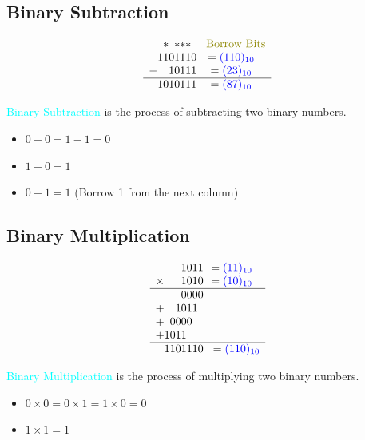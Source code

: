 \documentclass{book}
\begin{document}
\subsection{Binary Subtraction}
\raggedright
\begin{figure}
    \[
    \begin{array}{c@{}c@{}c@{}c@{}c@{}c@{}c@{}c@{}c}
        & & * & & * & * & * & & \hspace{3mm} \textcolor{olive}{\text{Borrow Bits}}\\
        & 1 & 1 & 0 & 1 & 1 & 1 & 0 & = \textcolor{blue}{(110)_{10}}\\
        - & & & 1 & 0 & 1 & 1 & 1 & = \textcolor{blue}{(23)_{10}}\\
        \hline
        & 1 & 0 & 1 & 0 & 1 & 1 & 1 & = \textcolor{blue}{(87)_{10}}
    \end{array}
    \]
\end{figure}
\textcolor{cyan}{Binary Subtraction} is the process of subtracting two binary numbers.\\
\begin{itemize}
    \item \(0 - 0 = 1 - 1 = 0\)
    \item \(1 - 0 = 1\)
    \item \(0 - 1 = 1\) (Borrow 1 from the next column)
\end{itemize}
\subsection{Binary Multiplication}
\raggedright
\begin{figure}
    \[
    \begin{array}{c@{}c@{}c@{}c@{}c@{}c@{}c@{}c@{}c}
        & & & & 1 & 0 & 1 & 1 & = \textcolor{blue}{(11)_{10}}\\
        \times & & & & 1 & 0 & 1 & 0 & = \textcolor{blue}{(10)_{10}}\\
        \hline
        & & & & 0 & 0 & 0 & 0 & \\
        + & & & 1 & 0 & 1 & 1 & & \\
        + & & 0 & 0 & 0 & 0 & & & \\
        + & 1 & 0 & 1 & 1 & & & & \\
        \hline
        & 1 & 1 & 0 & 1 & 1 & 1 & 0 & 
        \hspace{3mm} = \textcolor{blue}{(110)_{10}}
    \end{array}
    \]
\end{figure}
\textcolor{cyan}{Binary Multiplication} is the process of multiplying two binary numbers.\\
\begin{itemize}
    \item \(0 \times 0 = 0 \times 1 = 1 \times 0 = 0\)
    \item \(1 \times 1 = 1\)
\end{itemize}
\vspace{0.5cm}
\end{document}
